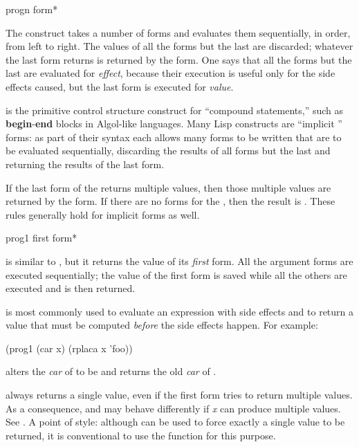 \begin{defspec}
progn {form}*

The  construct takes a number of forms and evaluates
them sequentially, in order, from left to right.  The values of all
the forms but the last are discarded; whatever the last form returns
is returned by the  form.
One says that all the forms but the last are evaluated for \emph{effect},
because their execution is useful only for the side effects caused,
but the last form is executed for \emph{value}.

 is the primitive control structure construct for ``compound
statements,'' such as \textbf{begin}-\textbf{end} blocks in
Algol-like languages.
Many Lisp constructs are ``implicit '' forms:
as part of their syntax each allows many forms to be written
that are to be evaluated sequentially, discarding the results
of all forms but the last and returning the results of the last form.

If the last form of the  returns multiple values, then those
multiple values are returned by the  form.  If there are no forms
for the , then the result is {\false}.  These rules generally hold for
implicit  forms as well.
\end{defspec}

\begin{defmac}
prog1 first {form}*

 is similar to , but it returns the value of
its \emph{first} form.  All the argument forms are executed sequentially;
the value of the first form is saved while all the others are executed
and is then returned.

 is most commonly used to evaluate an expression with side
effects and to return a value that must be computed \emph{before} the side
effects happen.
For example:
\begin{lisp}
(prog1 (car x) (rplaca x 'foo))
\end{lisp}
alters the \emph{car} of  to be  and returns the old \emph{car}
of .

 always returns a single value, even if the first form
tries to return multiple values.
As a consequence,
 and  may behave differently
if \emph{x} can produce multiple values.  See .
A point of style:
although  can be used to force exactly a single value to
be returned, it is conventional to use the
function  for this purpose.
\end{defmac}

